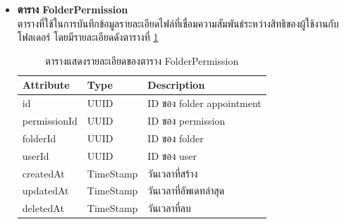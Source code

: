 \documentclass[12pt,oneside,openright,a4paper]{cpe-thai-project}
\begin{document}
\begin{itemize}
\item \textbf{ตาราง FolderPermission}\\
ตารางที่ใช้ในการบันทึกข้อมูลรายละเอียดไฟล์ที่เชื่อมความสัมพันธ์ระหว่างสิทธิของผู้ใช้งานกับโฟลเดอร์ โดยมีรายละเอียดดังตารางที่ \ref{tbl:dbFolderPermission}
\begin{table}[!ht]
    \centering
    \begin{tabular}{|p{4cm}|p{2cm}|p{6cm}|}
    \hline
    \textbf{Attribute} & \textbf{Type} & \textbf{Description}   \\ \hline
    id           & UUID      & ID ของ folder appointment \\ \hline
    permissionId & UUID      & ID ของ permission         \\ \hline
    folderId     & UUID      & ID ของ folder             \\ \hline
    userId       & UUID      & ID ของ user               \\ \hline
    createdAt    & TimeStamp & วันเวลาที่สร้าง           \\ \hline
    updatedAt    & TimeStamp & วันเวลาที่อัพเดทล่าสุด    \\ \hline
    deletedAt    & TimeStamp & วันเวลาที่ลบ            \\ \hline
    \end{tabular}
    \caption{\centering  ตารางแสดงรายละเอียดของตาราง FolderPermission} \label{tbl:dbFolderPermission}
\end{table}


\end{itemize}
\end{document}

